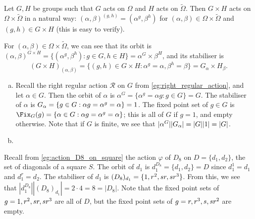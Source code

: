 \begin{example}\label{eg:direct_product_action}
    Let $G,H$ be groups such that $G$ acts on $\Omega$ and $H$ acts on $\tilde\Omega$. Then $G \times H$ acts on $\Omega \times \tilde\Omega$ in a natural way: $(\alpha,\beta)^{(g,h)} = (\alpha^g,\beta^h)$ for $(\alpha,\beta) \in \Omega \times \tilde\Omega$ and $(g,h) \in G \times H$ (this is easy to verify).

    For $(\alpha,\beta) \in \Omega \times \tilde\Omega$, we can see that its orbit is $(\alpha,\beta)^{G \times H} = \{(\alpha^g,\beta^h) : g \in G,h \in H\} = \alpha^G \times \beta^H$, and its stabiliser is
    $$(G \times H)_{(\alpha,\beta)} = \{(g,h) \in G \times H : \alpha^g = \alpha,\beta^h = \beta\} = G_\alpha \times H_\beta.$$
\end{example}

\begin{example}\label{eg:rra_orbits_stabilisers}
    \begin{enumerate}[(a)]
        \item Recall the right regular action $\mathcal{R}$ on $G$ from \autoref{eg:right_regular_action}, and let $\alpha \in G$. Then the orbit of $\alpha$ is $\alpha^G = \{\alpha^g = \alpha g : g \in G\} = G$. The stabiliser of $\alpha$ is $\added{2}{G_\alpha} = \{g \in G : \alpha g = \alpha^g = \alpha\} = 1$. The fixed point set of $g \in G$ is $\Fix_G(g) = \{\alpha \in G : \alpha g = \alpha^g = \alpha\}$; this is all of $G$ if $g = 1$, and empty otherwise. Note that if $G$ is finite, we see that $|\alpha^G| |\added{2}{G_\alpha}| = |G| |1| = |G|$.
        \item {}
    \end{enumerate}
\end{example}

\begin{example}\label{eg:D8_diagonals_orbits_stabilisers}
    Recall from \autoref{eg:action_D8_on_square} the action $\varphi$ of $D_8$ on $D = \{d_1,d_2\}$, the set of diagonals of a square $S$. The orbit of $d_1$ is $d_1^{D_8} = \{d_1,d_2\} = D$ since $d_1^1 = d_1$ and $d_1^r = d_2$. The stabiliser of $d_1$ is $(D_8)_{d_1} = \{1,r^2,\added{2}{sr,sr^3}\}$. From this, we see that $|d_1^{D_8}| |(D_8)_{d_1}| = 2 \cdot 4 = 8 = |D_8|$. Note that the fixed point sets of $g = 1,r^2,\added{2}{sr,sr^3}$ are all of $D$, but the fixed point sets of $g = r,r^3,s,\added{2}{sr^2}$ are empty.
\end{example}

